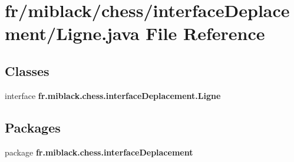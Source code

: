 \section{fr/miblack/chess/interface\-Deplacement/\-Ligne.java File Reference}
\label{Ligne_8java}
\subsection*{Classes}
\begin{DoxyCompactItemize}
\item 
interface {\bf fr.\-miblack.\-chess.\-interface\-Deplacement.\-Ligne}
\end{DoxyCompactItemize}
\subsection*{Packages}
\begin{DoxyCompactItemize}
\item 
package {\bf fr.\-miblack.\-chess.\-interface\-Deplacement}
\end{DoxyCompactItemize}
